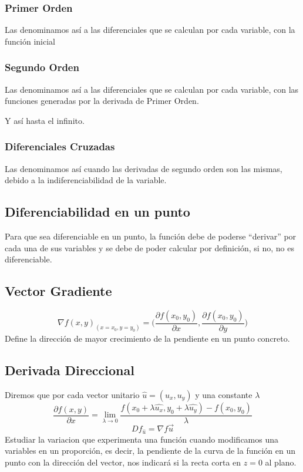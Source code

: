 \subsubsection{Primer Orden}
\noindent Las denominamos así a las diferenciales que se calculan por cada variable, con la función inicial
\subsubsection{Segundo Orden}
\noindent Las denominamos así a las diferenciales que se calculan por cada variable, con las funciones generadas por la derivada de Primer Orden. \par Y así hasta el infinito.
\subsubsection{Diferenciales Cruzadas}
\noindent Las denominamos así cuando las derivadas de segundo orden son las mismas, debido a la indiferenciabilidad de la variable.
\subsection{Diferenciabilidad en un punto}
\noindent Para que sea diferenciable en un punto, la función debe de poderse ``derivar'' por cada una de sus variables y se debe de poder calcular por definición, si no, no es diferenciable.
\subsection{Vector Gradiente}
\[
        \boxed{\nabla f(x,y)_{{(x=x_0, y=y_0)}} = \Big(\frac{\partial f(x_0,y_0)}{\partial x},\frac{\partial f(x_0,y_0)}{\partial y}\Big)}
\]
\noindent Define la dirección de mayor crecimiento de la pendiente en un punto concreto.
\subsection{Derivada Direccional}
\noindent Diremos que por cada vector unitario \(\hat{u} = (u_x,u_y)\) y una constante \(\lambda\)
\[
        \frac{\partial f(x,y)}{\partial x} = \lim_{\lambda\rightarrow 0} \frac{f(x_0+\lambda \hat{u_x}, y_0 + \lambda \hat{u_y})-f(x_0,y_0)}{\lambda}
\]
\[
        Df_{\hat{u}} = \nabla f \vec{u}
\]
\noindent Estudiar la variacion que experimenta una función cuando modificamos una variables en un proporción, es decir, la pendiente de la curva de la función en un punto con la dirección del vector, nos indicará si la recta corta en \(z=0\) al plano.
